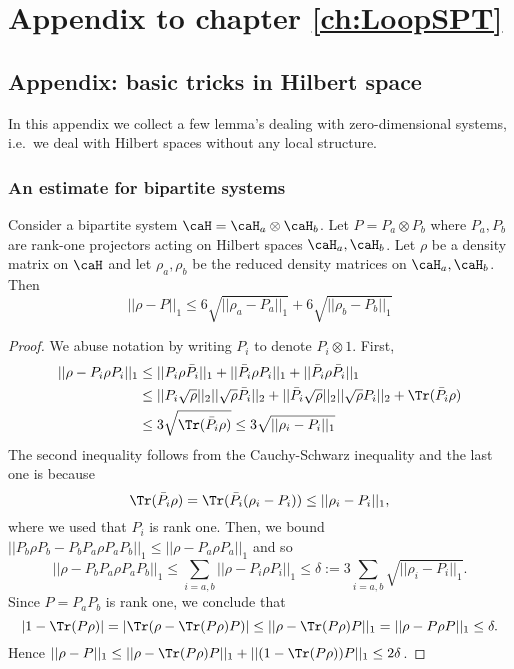\chapter{Appendix to chapter \ref{ch:LoopSPT}}\label{ch:mySecondAppendix}


\section{Appendix:  basic tricks in Hilbert space}\label{app: tricks}
In this appendix we collect a few lemma's dealing with zero-dimensional systems, i.e.\ we deal with Hilbert spaces without any local structure. 

\subsection{An estimate for bipartite systems}
\begin{lemma}\label{lem: bipartite}
	Consider a bipartite system $\caH=\caH_a\otimes\caH_b$. Let $P=P_a\otimes P_b$ where $P_a,P_b$ are rank-one projectors acting on Hilbert spaces $\caH_a,\caH_b$. Let $\rho$ be a density matrix on $\caH$ and let $\rho_a,\rho_b$ be the reduced density matrices on $\caH_a,\caH_b$.
	Then 
	$$
	||\rho-P||_1 \leq 6\sqrt{ ||\rho_a-P_a||_1}+  6\sqrt{||\rho_b-P_b||_1  }
	$$
\end{lemma}
\begin{proof}
	We abuse notation by writing $P_i$ to denote $P_i \otimes 1$. 
	First,
	\begin{align*}
	||\rho-P_i\rho P_i||_1  & \leq   ||P_i\rho\bar P_i ||_1+ ||\bar P_i\rho P_i ||_1+||\bar P_i\rho\bar P_i ||_1 \\
	& \leq  || P_i\sqrt{\rho} ||_2 || \sqrt{\rho}\bar P_i ||_2  + ||\bar P_i\sqrt{\rho} ||_2 || \sqrt{\rho} P_i ||_2  +  \Tr ( \bar P_i \rho ) \\
	&  \leq  3 \sqrt{\Tr ( \bar P_i \rho )} 
	\leq 3\sqrt{||\rho_i-P_i||_1}  
	\end{align*}
	The second inequality follows from the Cauchy-Schwarz inequality and the last one is because
	$$\Tr ( \bar P_i \rho ) = \Tr ( \bar P_i (\rho_i - P_i) )\leq ||\rho_i-P_i||_1,$$ where we used that $P_i$ is rank one. Then, we bound  $ ||P_b\rho P_b-P_b P_a\rho P_a P_b ||_1 \leq  ||\rho- P_a\rho P_a  ||_1 $ and so  
	$$ || \rho- P_b P_a\rho P_a P_b ||_1 \leq \sum_{i=a,b}   ||\rho- P_i\rho P_i  ||_1 \leq \delta := 3\sum_{i=a,b}\sqrt{||\rho_i-P_i||_1}.
	$$
	Since $P=P_aP_b$ is rank one, we conclude that
	$$
	|1-\Tr (P\rho)| = |\Tr(\rho-\Tr (P\rho)P)|\leq ||\rho-\Tr (P\rho) P ||_1 = || \rho- P\rho P ||_1 \leq  \delta.
	$$
	Hence $|| \rho- P ||_1 \leq ||\rho-\Tr (P\rho) P ||_1+||(1-\Tr (P\rho)) P ||_1 \leq 2\delta$. 
\end{proof}

